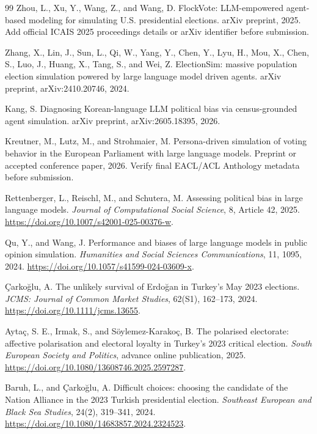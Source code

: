 \documentclass[pdflatex,sn-mathphys-num,iicol]{sn-jnl}
\begin{document}
\begin{thebibliography}{99}
Zhou, L., Xu, Y., Wang, Z., and Wang, D.
FlockVote: LLM-empowered agent-based modeling for simulating U.S. presidential elections.
arXiv preprint, 2025. Add official ICAIS 2025 proceedings details or arXiv identifier before submission.

Zhang, X., Lin, J., Sun, L., Qi, W., Yang, Y., Chen, Y., Lyu, H., Mou, X., Chen, S., Luo, J., Huang, X., Tang, S., and Wei, Z.
ElectionSim: massive population election simulation powered by large language model driven agents.
arXiv preprint, arXiv:2410.20746, 2024.

Kang, S.
Diagnosing Korean-language LLM political bias via census-grounded agent simulation.
arXiv preprint, arXiv:2605.18395, 2026.

Kreutner, M., Lutz, M., and Strohmaier, M.
Persona-driven simulation of voting behavior in the European Parliament with large language models.
Preprint or accepted conference paper, 2026. Verify final EACL/ACL Anthology metadata before submission.

Rettenberger, L., Reischl, M., and Schutera, M.
Assessing political bias in large language models.
\textit{Journal of Computational Social Science}, 8, Article 42, 2025.
\url{https://doi.org/10.1007/s42001-025-00376-w}.

Qu, Y., and Wang, J.
Performance and biases of large language models in public opinion simulation.
\textit{Humanities and Social Sciences Communications}, 11, 1095, 2024.
\url{https://doi.org/10.1057/s41599-024-03609-x}.

Çarkoğlu, A.
The unlikely survival of Erdoğan in Turkey's May 2023 elections.
\textit{JCMS: Journal of Common Market Studies}, 62(S1), 162--173, 2024.
\url{https://doi.org/10.1111/jcms.13655}.

Aytaç, S. E., Irmak, S., and Söylemez-Karakoç, B.
The polarised electorate: affective polarisation and electoral loyalty in Turkey's 2023 critical election.
\textit{South European Society and Politics}, advance online publication, 2025.
\url{https://doi.org/10.1080/13608746.2025.2597287}.

Baruh, L., and Çarkoğlu, A.
Difficult choices: choosing the candidate of the Nation Alliance in the 2023 Turkish presidential election.
\textit{Southeast European and Black Sea Studies}, 24(2), 319--341, 2024.
\url{https://doi.org/10.1080/14683857.2024.2324523}.


\end{thebibliography}
\end{document}
